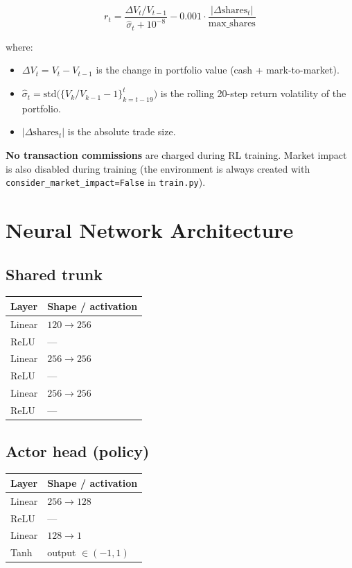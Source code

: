 \documentclass[11pt,a4paper]{article}
\begin{document}
\[
  r_t = \frac{\Delta V_t / V_{t-1}}{\hat{\sigma}_t + 10^{-8}} - 0.001 \cdot \frac{|\Delta\text{shares}_t|}{\text{max\_shares}}
\]

where:
\begin{itemize}
  \item $\Delta V_t = V_t - V_{t-1}$ is the change in portfolio value (cash + mark-to-market).
  \item $\hat{\sigma}_t = \text{std}\bigl(\{V_k/V_{k-1} - 1\}_{k=t-19}^{t}\bigr)$ is the rolling 20-step return volatility of the portfolio.
  \item $|\Delta\text{shares}_t|$ is the absolute trade size.
\end{itemize}

\textbf{No transaction commissions} are charged during RL training. Market impact is also disabled during training (the environment is always created with \texttt{consider\_market\_impact=False} in \texttt{train.py}).

\section{Neural Network Architecture}

\subsection{Shared trunk}

\begin{center}
\begin{tabular}{ll}
\toprule
Layer & Shape / activation \\
\midrule
Linear & $120 \to 256$ \\
ReLU   & --- \\
Linear & $256 \to 256$ \\
ReLU   & --- \\
Linear & $256 \to 256$ \\
ReLU   & --- \\
\bottomrule
\end{tabular}
\end{center}

\subsection{Actor head (policy)}

\begin{center}
\begin{tabular}{ll}
\toprule
Layer & Shape / activation \\
\midrule
Linear & $256 \to 128$ \\
ReLU   & --- \\
Linear & $128 \to 1$ \\
Tanh   & output $\in (-1,1)$ \\
\bottomrule
\end{tabular}
\end{center}
\end{document}
